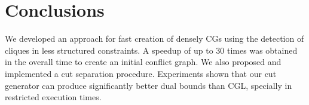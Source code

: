 \documentclass{endm}
\begin{document}
\section{Conclusions}\label{conclusions}

We developed an approach for fast creation of densely CGs using the detection of cliques in less structured constraints. A speedup of up to 30 times was obtained in the overall time to create an initial conflict graph. We also proposed and implemented a cut separation procedure. Experiments shown that our cut generator can produce significantly better dual bounds than CGL, specially in restricted execution times.



\end{document}
